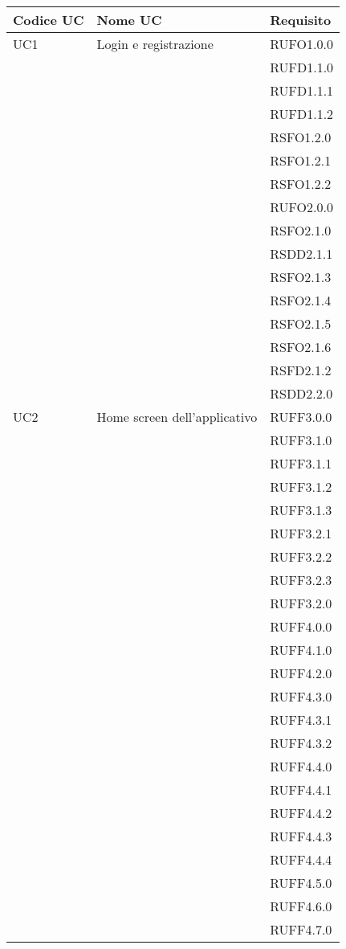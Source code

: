 \begin{center}
\begin{longtable}{lp{}l}
\toprule Codice UC & Nome UC  & Requisito\\
\midrule
UC1 & Login e registrazione & RUFO1.0.0 \\
 &  & RUFD1.1.0 \\
 &  & RUFD1.1.1 \\
 &  & RUFD1.1.2 \\
 &  & RSFO1.2.0 \\
 &  & RSFO1.2.1 \\
 &  & RSFO1.2.2 \\
 &  & RUFO2.0.0 \\
 &  & RSFO2.1.0 \\
 &  & RSDD2.1.1 \\
 &  & RSFO2.1.3 \\
 &  & RSFO2.1.4 \\
 &  & RSFO2.1.5 \\
 &  & RSFO2.1.6 \\
 &  & RSFD2.1.2 \\
 &  & RSDD2.2.0 \\
UC2 & Home screen dell'applicativo & RUFF3.0.0 \\
 &  & RUFF3.1.0 \\
 &  & RUFF3.1.1 \\
 &  & RUFF3.1.2 \\
 &  & RUFF3.1.3 \\
 &  & RUFF3.2.1 \\
 &  & RUFF3.2.2 \\
 &  & RUFF3.2.3 \\
 &  & RUFF3.2.0 \\
 &  & RUFF4.0.0 \\
 &  & RUFF4.1.0 \\
 &  & RUFF4.2.0 \\
 &  & RUFF4.3.0 \\
 &  & RUFF4.3.1 \\
 &  & RUFF4.3.2 \\
 &  & RUFF4.4.0 \\
 &  & RUFF4.4.1 \\
 &  & RUFF4.4.2 \\
 &  & RUFF4.4.3 \\
 &  & RUFF4.4.4 \\
 &  & RUFF4.5.0 \\
 &  & RUFF4.6.0 \\
 &  & RUFF4.7.0 \\

\end{longtable}
\end{center}
